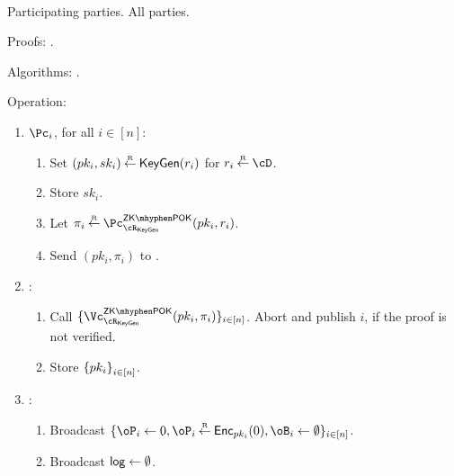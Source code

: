 \begin{protocol}~\label{prot:ConfidentialTransactions:Init}
	

	\item[Participating parties.] All parties.
			
			
	\item[Proofs:]   \piZKPOK{\rKeyGen}. 
	
	
	\item[Algorithms:]    \KeyGen.
	
			
\item[Operation:] ~
			
			
			\begin{enumerate}
				
				\item   $\Pc_i$, for  all $i\in [n]$:
				\begin{enumerate}
					\item Set $(pk_i,sk_i) \mathbin{\stackrel{\mbox{\tiny R}}{\leftarrow}} \mathsf{KeyGen}(r_i)$ for $r_i \getsr \cD$.
					
					\item Store $sk_i$.
					
					\item Let $\pi_i \getsr \pZKPOK{\rKeyGen}(pk_i,r_i)$.
					
					\item Send $(pk_i,\pi_i)$ to \Cc.
					
					
				\end{enumerate}
				
				\item \Cc:
				\begin{enumerate}
					
					\item Call $\sset{ \vZKPOK{\rKeyGen}(pk_i,\pi_i)}_{i\in [n]}$. Abort and publish $i$, if the \ith  proof is not verified. 
										
					\item Store $\set{pk_i}_{i\in [n]}$.
				\end{enumerate}
				
				
				\item \Cc: 
				\begin{enumerate}
					\item 	Broadcast $\sset{\oP_i \asn 0, \oP_i\getsr \Enc_{pk_i}(0),\oB_i\asn \emptyset}_{i\in [n]}$.
					
					\item    Broadcast $\mathsf{log} \leftarrow \emptyset$.
				\end{enumerate}								
			\end{enumerate}
\end{protocol}

